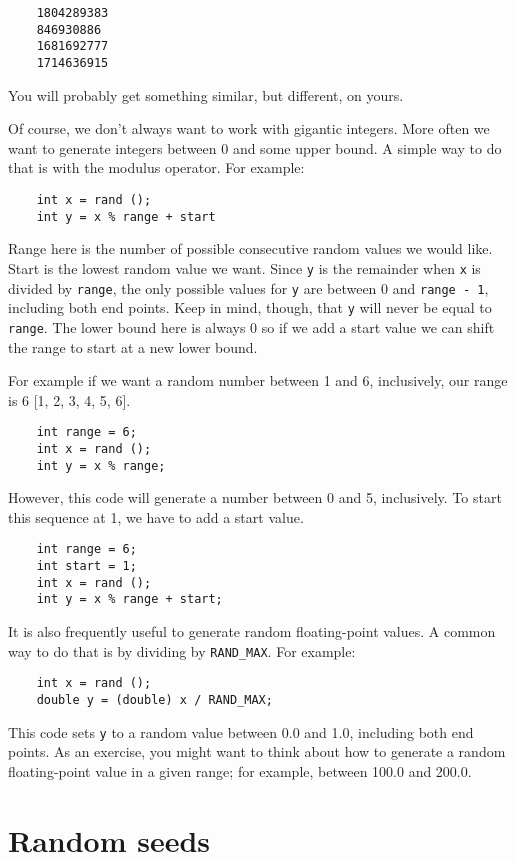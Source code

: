 \begin{verbatim}
	1804289383
	846930886
	1681692777
	1714636915
\end{verbatim}
%
You will probably get something similar, but different, on yours.

Of course, we don't always want to work with gigantic integers.
More often we want to generate integers between 0 and some
upper bound.  A simple way to do that is with the modulus
operator.  For example:

\begin{verbatim}
 	int x = rand ();
 	int y = x % range + start
\end{verbatim}
%
Range here is the number of possible consecutive random values we would like. 
Start is the lowest random value we want.  Since {\tt y} is the remainder when {\tt x} is divided by
{\tt range}, the only possible values for {\tt y}
are between 0 and {\tt range - 1}, including both
end points.   Keep in mind, though, that {\tt y} will never
be equal to {\tt range}. The lower bound here is always 0 so if we add a start value we can shift the range to start at a new lower bound.

For example if we want a random number between 1 and 6, inclusively, our range is 6  [1, 2, 3, 4, 5, 6]. 
\begin{verbatim}
 	int range = 6;
 	int x = rand ();
 	int y = x % range;
\end{verbatim}
%
However, this code will generate a number between 0 and 5,  inclusively. To start this sequence at 1, we have to add a start value.

\begin{verbatim}
 	int range = 6;
 	int start = 1;
 	int x = rand ();
 	int y = x % range + start;
\end{verbatim}
%
It is also frequently useful to generate random floating-point values.
A common way to do that is by dividing by {\tt RAND\_MAX}.  For
example:

\begin{verbatim}
 	int x = rand ();
 	double y = (double) x / RAND_MAX;
\end{verbatim}
%
This code sets {\tt y} to a random value between 0.0 and 1.0,
including both end points.  As an exercise, you might want to
think about how to generate a random floating-point value in
a given range; for example, between 100.0 and 200.0.


\section{Random seeds}
\label{Random seeds}

